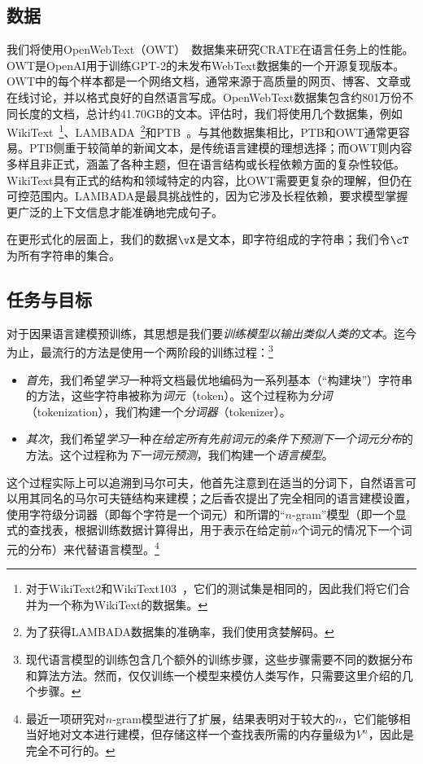 \documentclass[../../book-main_zh.tex]{subfiles}
\begin{document}
\subsection{数据} \label{sub:clm_text_data}

我们将使用OpenWebText（OWT）~\cite{Gokaslan2019OpenWeb}数据集来研究CRATE在语言任务上的性能。OWT是OpenAI用于训练GPT-2的未发布WebText数据集的一个开源复现版本。OWT中的每个样本都是一个网络文档，通常来源于高质量的网页、博客、文章或在线讨论，并以格式良好的自然语言写成。OpenWebText数据集包含约801万份不同长度的文档，总计约41.70GB的文本。评估时，我们将使用几个数据集，例如WikiText~\cite{merity2016pointer}\footnote{对于WikiText2和WikiText103~\cite{merity2016pointer}，它们的测试集是相同的，因此我们将它们合并为一个称为WikiText的数据集。}、LAMBADA~\cite{paperno2016lambadadatasetwordprediction}\footnote{为了获得LAMBADA数据集的准确率，我们使用贪婪解码。}和PTB~\cite{marcus-etal-1993-building}。与其他数据集相比，PTB和OWT通常更容易。PTB侧重于较简单的新闻文本，是传统语言建模的理想选择；而OWT则内容多样且非正式，涵盖了各种主题，但在语言结构或长程依赖方面的复杂性较低。WikiText具有正式的结构和领域特定的内容，比OWT需要更复杂的理解，但仍在可控范围内。LAMBADA是最具挑战性的，因为它涉及长程依赖，要求模型掌握更广泛的上下文信息才能准确地完成句子。

在更形式化的层面上，我们的数据\(\vX\)是文本，即字符组成的字符串；我们令\(\cT\)为所有字符串的集合。

\subsection{任务与目标} \label{sub:clm_text_objective}

对于因果语言建模预训练，其思想是我们要\textit{训练模型以输出类似人类的文本}。迄今为止，最流行的方法是使用一个两阶段的训练过程：\footnote{现代语言模型的训练包含几个额外的训练步骤，这些步骤需要不同的数据分布和算法方法。然而，仅仅训练一个模型来模仿人类写作，只需要这里介绍的几个步骤。}
\begin{itemize}
    \item \textit{首先}，我们希望\textit{学习}一种将文档最优地编码为一系列基本（“构建块”）字符串的方法，这些字符串被称为\textit{词元}（token）。这个过程称为\textit{分词}（tokenization），我们构建一个\textit{分词器}（tokenizer）。
    \item \textit{其次}，我们希望\textit{学习}一种\textit{在给定所有先前词元的条件下预测下一个词元分布}的方法。这个过程称为\textit{下一词元预测}，我们构建一个\textit{语言模型}。
\end{itemize}
这个过程实际上可以追溯到马尔可夫，他首先注意到在适当的分词下，自然语言可以用其同名的马尔可夫链结构来建模\citep{markov2006example}；之后香农提出了完全相同的语言建模设置，使用字符级分词器（即每个字符是一个词元）和所谓的“\(n\)-gram”模型（即一个显式的查找表，根据训练数据计算得出，用于表示在给定前\(n\)个词元的情况下一个词元的分布）来代替语言模型\citep{Shannon-1948}。\footnote{最近一项研究\citep{liu2024infini}对\(n\)-gram模型进行了扩展，结果表明对于较大的\(n\)，它们能够相当好地对文本进行建模，但存储这样一个查找表所需的内存量级为\(V^{n}\)，因此是完全不可行的。}
\end{document}
